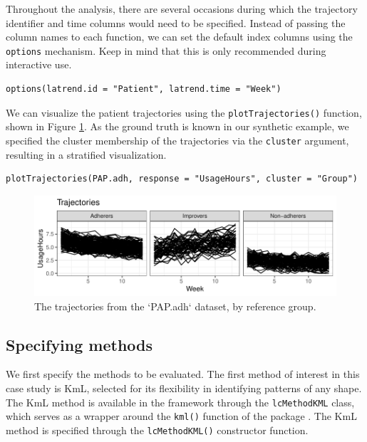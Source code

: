 Throughout the analysis, there are several occasions during which the trajectory identifier and time columns would need to be specified. Instead of passing the column names to each function, we can set the default index columns using the \texttt{options} mechanism. Keep in mind that this is only recommended during interactive use.

\begin{verbatim}
options(latrend.id = "Patient", latrend.time = "Week")
\end{verbatim}

We can visualize the patient trajectories using the \texttt{plotTrajectories()} function, shown in Figure \ref{fig:data}. As the ground truth is known in our synthetic example, we specified the cluster membership of the trajectories via the \texttt{cluster} argument, resulting in a stratified visualization.

\begin{verbatim}
plotTrajectories(PAP.adh, response = "UsageHours", cluster = "Group")
\end{verbatim}

\begin{figure}

{\centering \includegraphics{figures/data-1} 

}

\caption{The trajectories from the `PAP.adh` dataset, by reference group.}\label{fig:data}
\end{figure}

\subsection{Specifying methods}\label{specifying-methods}

We first specify the methods to be evaluated. The first method of interest in this case study is KmL, selected for its flexibility in identifying patterns of any shape. The KmL method is available in the framework through the \texttt{lcMethodKML} class, which serves as a wrapper around the \texttt{kml()} function of the  package \citep{genolini2015kml}. The KmL method is specified through the \texttt{lcMethodKML()} constructor function.


